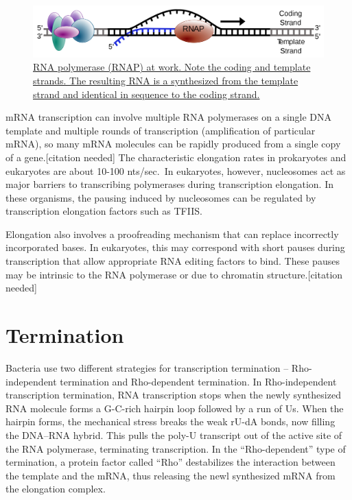 \begin{figure}

{\centering \includegraphics[width=0.7\linewidth]{./figures/transcription/Simple_transcription_elongation1} 

}

\caption{\href{https://commons.wikimedia.org/wiki/File:Simple_transcription_elongation1.svg}{RNA polymerase (RNAP) at work. Note the coding and template strands. The resulting RNA is a synthesized from the template strand and identical in sequence to the coding strand.}}\label{fig:elongation}
\end{figure}

mRNA transcription can involve multiple RNA polymerases on a single DNA template and multiple rounds of transcription (amplification of particular mRNA), so many mRNA molecules can be rapidly produced from a single copy of a gene.{[}citation needed{]} The characteristic elongation rates in prokaryotes and eukaryotes are about 10-100 nts/sec.~In eukaryotes, however, nucleosomes act as major barriers to transcribing polymerases during transcription elongation. In these organisms, the pausing induced by nucleosomes can be regulated by transcription elongation factors such as TFIIS.

Elongation also involves a proofreading mechanism that can replace incorrectly incorporated bases. In eukaryotes, this may correspond with short pauses during transcription that allow appropriate RNA editing factors to bind. These pauses may be intrinsic to the RNA polymerase or due to chromatin structure.{[}citation needed{]}

\hypertarget{termination-2}{%
\section{Termination}\label{termination-2}}

Bacteria use two different strategies for transcription termination -- Rho-independent termination and Rho-dependent termination. In Rho-independent transcription termination, RNA transcription stops when the newly synthesized RNA molecule forms a G-C-rich hairpin loop followed by a run of Us. When the hairpin forms, the mechanical stress breaks the weak rU-dA bonds, now filling the DNA--RNA hybrid. This pulls the poly-U transcript out of the active site of the RNA polymerase, terminating transcription. In the ``Rho-dependent'' type of termination, a protein factor called ``Rho'' destabilizes the interaction between the template and the mRNA, thus releasing the newl synthesized mRNA from the elongation complex.

